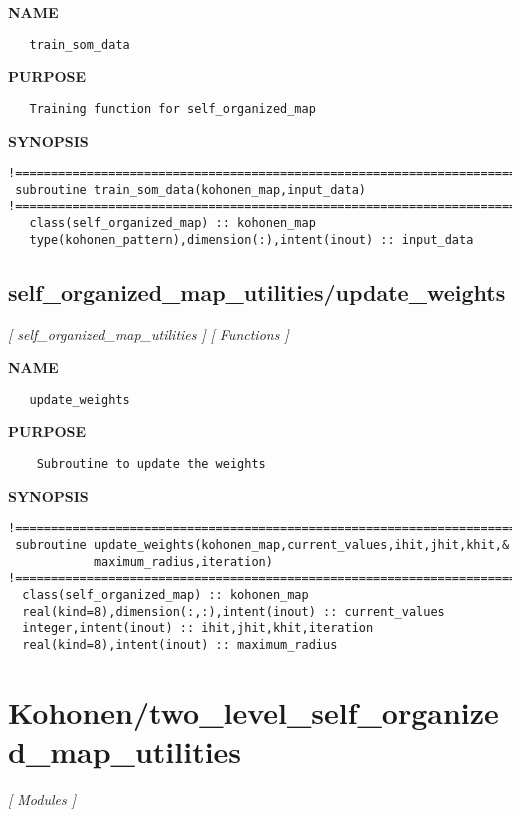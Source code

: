 \documentclass{article}
\begin{document}
\label{ch:robo55}
\label{ch:self_organized_map_utilities_train_som_data}
\textbf{NAME}
\begin{verbatim}
   train_som_data
\end{verbatim}
\textbf{PURPOSE}
\begin{verbatim}
   Training function for self_organized_map 
\end{verbatim}
\textbf{SYNOPSIS}
\begin{verbatim}
!========================================================================================
 subroutine train_som_data(kohonen_map,input_data)
!========================================================================================
   class(self_organized_map) :: kohonen_map
   type(kohonen_pattern),dimension(:),intent(inout) :: input_data
\end{verbatim}
\newpage
\subsection{self\_organized\_map\_utilities/update\_weights}
\textsl{[ self\_organized\_map\_utilities ]}
\textsl{[ Functions ]}

\label{ch:robo56}
\label{ch:self_organized_map_utilities_update_weights}
\textbf{NAME}
\begin{verbatim}
   update_weights
\end{verbatim}
\textbf{PURPOSE}
\begin{verbatim}
    Subroutine to update the weights   
\end{verbatim}
\textbf{SYNOPSIS}
\begin{verbatim}
!========================================================================================
 subroutine update_weights(kohonen_map,current_values,ihit,jhit,khit,&
            maximum_radius,iteration) 
!========================================================================================
  class(self_organized_map) :: kohonen_map
  real(kind=8),dimension(:,:),intent(inout) :: current_values
  integer,intent(inout) :: ihit,jhit,khit,iteration
  real(kind=8),intent(inout) :: maximum_radius
\end{verbatim}
\newpage
\section{Kohonen/two\_level\_self\_organized\_map\_utilities}
\textsl{[ Modules ]}
\end{document}
